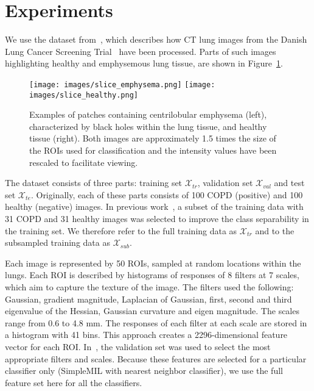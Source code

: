 \documentclass[10pt,conference,a4paper]{IEEEtran}
\begin{document}
\section{Experiments}\label{sec:experiments}

We use the dataset from~\cite{sorensen2012texture}, which describes how CT lung images from the Danish Lung Cancer Screening Trial~\cite{pedersen2009danish} have been processed. Parts of such images highlighting healthy and emphysemous lung tissue, are shown in Figure~\ref{fig:images}.

\begin{figure}[ht]
 \centering
  \texttt{[image: images/slice\_emphysema.png]}
  \texttt{[image: images/slice\_healthy.png]}

 \caption[]{Examples of patches containing centrilobular emphysema (left), characterized by black holes within the lung tissue, and healthy tissue (right). Both images are approximately 1.5 times the size of the ROIs used for classification and the intensity values have been rescaled to facilitate viewing.}
 \label{fig:images}
\end{figure}


The dataset consists of three parts: training set $\mathcal{X}_{tr}$, validation set $\mathcal{X}_{val}$ and test set $\mathcal{X}_{te}$. Originally, each of these parts consists of 100 COPD (positive) and 100 healthy (negative) images. In previous work~\cite{sorensen2012texture}, a subset of the training data with 31 COPD and 31 healthy images was selected to improve the class separability in the training set. We therefore refer to the full training data as $\mathcal{X}_{tr}$ and to the subsampled training data as $\mathcal{X}_{sub}$.

Each image is represented by 50 ROIs, sampled at random locations within the lungs. Each ROI is described by histograms of responses of 8 filters at 7 scales, which aim to capture the texture of the image. The filters used the following: Gaussian, gradient magnitude, Laplacian of Gaussian, first, second and third eigenvalue of the Hessian, Gaussian curvature and eigen magnitude. The scales range from 0.6 to 4.8 mm. The responses of each filter at each scale are stored in a histogram with 41 bins. This approach creates a 2296-dimensional feature vector for each ROI. In~\cite{sorensen2012texture}, the validation set was used to select the most appropriate filters and scales. Because these features are selected for a particular classifier only (SimpleMIL with nearest neighbor classifier), we use the full feature set here for all the classifiers.
\end{document}
